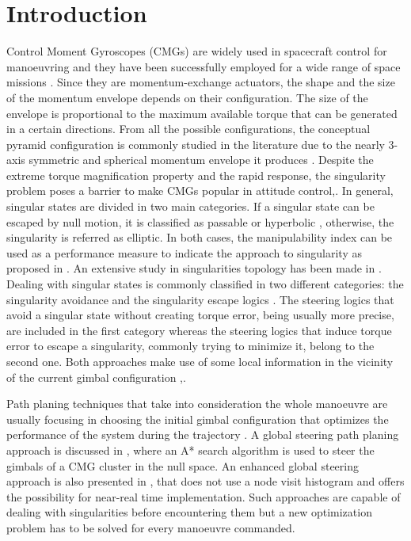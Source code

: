 \documentclass[aerospace,article,submit,moreauthors,dvi2pdf]{Definitions/mdpi}
\begin{document}

\section{Introduction}

Control Moment Gyroscopes (CMGs) are widely used in spacecraft control for manoeuvring and they have been successfully employed for a wide range of space missions \cite{futuremissions,defendini,wie2008space}. Since they are momentum-exchange actuators, the shape and the size of the momentum envelope depends on their configuration. The size of the envelope is proportional to the maximum available torque that can be generated in a certain directions. From all the possible configurations, the conceptual pyramid configuration is commonly studied in the literature due to the nearly 3-axis symmetric and spherical momentum envelope it produces \cite{SMCS}. Despite the extreme torque magnification property and the rapid response, the singularity problem poses a barrier to make CMGs popular in attitude control\cite{Bang},\cite{Lian}. In general, singular states are divided in two main categories. If a singular state can be escaped by null motion, it is classified as passable or hyperbolic \cite{Margulies}, otherwise, the singularity is  referred as elliptic. In both cases, the manipulability index can be used as a performance measure to indicate the approach to singularity as proposed in \cite{yoshikawa}. An extensive study in singularities topology has been made in \cite{Hirohisa2014,Rapid_Guo,Kurokawa1994}. Dealing with singular states is commonly classified  in two different categories: the singularity avoidance and the singularity escape logics \cite{HybridSteering}. The steering logics that avoid a singular state without creating torque error, being usually more precise, are included in the first category whereas the steering logics that induce torque error to escape a singularity, commonly trying to minimize it, belong to the second one. Both approaches make use of some local information in the vicinity of the current gimbal configuration \cite{bongwie2005},\cite{bongwie2001}. 

Path planing techniques that take into consideration the whole manoeuvre are usually focusing in choosing the initial gimbal configuration that optimizes the performance of the system during the trajectory \cite{vadali_preferred}. A global steering path planing approach is discussed in \cite{paradiso},\cite{paradiso2} where an A* search algorithm is used to steer the gimbals of a CMG cluster in the null space. An enhanced global steering approach is also presented in \cite{Papakonstantinou}, that does not use a node visit histogram and offers the possibility for near-real time implementation. Such approaches are capable of dealing with singularities before encountering them but a new optimization problem has to be solved for every manoeuvre commanded.
\end{document}
